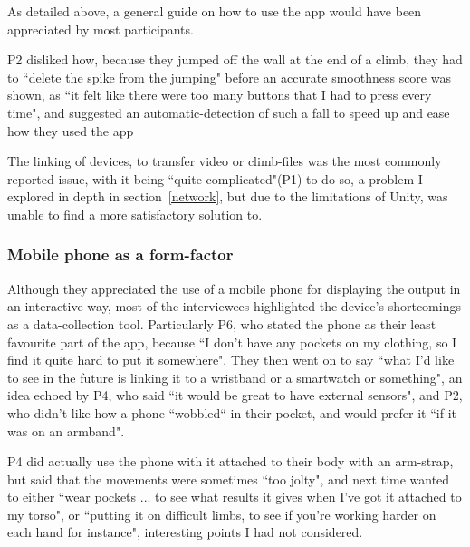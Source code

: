 As detailed above, a general guide on how to use the app would have been appreciated by most participants.

P2 disliked how, because they jumped off the wall at the end of a climb, they had to ``delete the spike from the jumping" before an accurate smoothness score was shown, as ``it felt like there were too many buttons that I had to press every time", and suggested an automatic-detection of such a fall to speed up and ease how they used the app

The linking of devices, to transfer video or climb-files was the most commonly reported issue, with it being ``quite complicated"(P1) to do so, a problem I explored in depth in section~\ref{network}, but due to the limitations of Unity, was unable to find a more satisfactory solution to.

\subsubsection{Mobile phone as a form-factor} 
Although they appreciated the use of a mobile phone for displaying the output in an interactive way, most of the interviewees highlighted the device's shortcomings as a data-collection tool.
Particularly P6, who stated the phone as their least favourite part of the app, because ``I don't have any pockets on my clothing, so I find it quite hard to put it somewhere".
They then went on to say ``what I'd like to see in the future is linking it to a wristband or a smartwatch or something", an idea echoed by P4, who said ``it would be great to have external sensors", and P2, who didn't like how a phone ``wobbled`` in their pocket, and would prefer it ``if it was on an armband".

P4 did actually use the phone with it attached to their body with an arm-strap, but said that the movements were sometimes ``too jolty", and next time wanted to either ``wear pockets ... to see what results it gives when I've got it attached to my torso", or ``putting it on difficult limbs, to see if you're working harder on each hand for instance", interesting points I had not considered.



